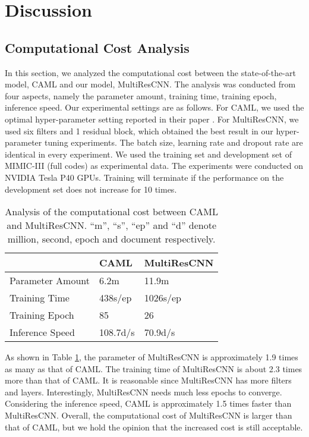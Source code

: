 \documentclass[letterpaper]{article} \usepackage{aaai20}  \usepackage{times}  \usepackage{helvet} \usepackage{courier}  \usepackage[hyphens]{url}  \usepackage{graphicx} \urlstyle{rm} \def\UrlFont{\rm}  \usepackage{graphicx}  \frenchspacing  \setlength{\pdfpagewidth}{8.5in}  \setlength{\pdfpageheight}{11in}
\begin{document}
\section{Discussion}
\subsection{Computational Cost Analysis}
In this section, we analyzed the computational cost between the state-of-the-art model, CAML and our model, MultiResCNN. The analysis was conducted from four aspects, namely the parameter amount, training time, training epoch, inference speed. Our experimental settings are as follows. For CAML, we used the optimal hyper-parameter setting reported in their paper \cite{mullenbach2018explainable}. For MultiResCNN, we used six filters and 1 residual block, which obtained the best result in our hyper-parameter tuning experiments. The batch size, learning rate and dropout rate are identical in every experiment. We used the training set and development set of MIMIC-III (full codes) as experimental data. The experiments were conducted on NVIDIA Tesla P40 GPUs. Training will terminate if the performance on the development set does not increase for 10 times.


\begin{table}[t]
\caption{Analysis of the computational cost between CAML and MultiResCNN. ``m'', ``s'', ``ep'' and ``d'' denote million, second, epoch and document respectively.}\smallskip
\centering
\begin{tabular}{l|l|l}
\hline
 & CAML & MultiResCNN\\
\hline
Parameter Amount & 6.2m & 11.9m \\
Training Time & 438s/ep  & 1026s/ep  \\
Training Epoch & 85 & 26 \\
Inference Speed & 108.7d/s & 70.9d/s \\
\hline
\end{tabular}
\label{table:cost}
\end{table}

As shown in Table \ref{table:cost}, the parameter of MultiResCNN is approximately 1.9 times as many as that of CAML. The training time of MultiResCNN is about 2.3 times more than that of CAML. It is reasonable since MultiResCNN has more filters and layers. Interestingly, MultiResCNN needs much less epochs to converge. Considering the inference speed, CAML is approximately 1.5 times faster than MultiResCNN. Overall, the computational cost of MultiResCNN is larger than that of CAML, but we hold the opinion that the increased cost is still acceptable.
\end{document}
